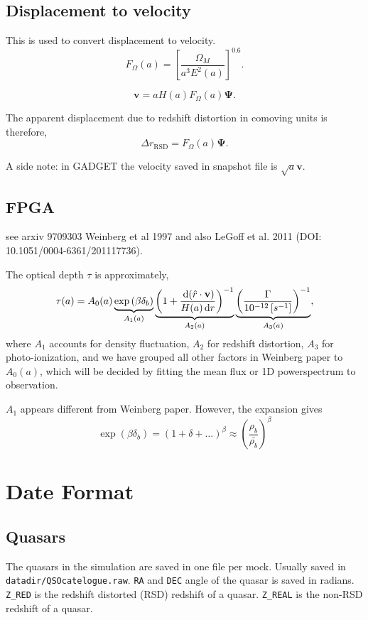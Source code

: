 \documentclass{paper}
\begin{document}
\subsection{Displacement to velocity}
This is used to convert displacement to velocity. 
\[
    F_\Omega(a) = \left[\frac{\Omega_M}{a^3 E^2(a)}\right]^{0.6} .
\]

\[
    \mathbf{v} = a H(a) F_\Omega(a) \mathbf{\Psi} .
\]

The apparent displacement due to redshift distortion in
comoving units is therefore,
\[
    \Delta r_\mathrm{RSD} = F_\Omega(a) \mathbf{\Psi} .
\]

A side note: in GADGET the velocity saved in snapshot file is 
$\sqrt{a}\mathbf{v}$.

\subsection{FPGA}
see arxiv 9709303 Weinberg et al 1997 and also  LeGoff et
al. 2011 (DOI: 10.1051/0004-6361/201117736).

The optical depth $\tau$ is approximately,
\[  \tau(a) = 
    A_0(a)
    \underbrace{
        \exp \left(\beta \delta_b \right)
    }_{A_1(a)}
    \underbrace{
        \left(1 + 
        \frac{\diff ( \hat{r} \cdot \mathbf{v})}
        {H(a) \diff r } \right)^{-1}
    }_{A_2(a)}
    \underbrace{
        \left(\frac{\Gamma}{\unit[10^{-12}][s^{-1}]}
        \right)^{-1}
    }_{A_3(a)}
    ,
\] where $A_1$ accounts for density fluctuation, 
         $A_2$ for redshift distortion, 
         $A_3$ for photo-ionization, 
   and we have grouped all other factors in Weinberg paper to $A_0(a)$, 
   which will be decided by fitting the mean flux or 1D
   powerspectrum to observation.

   $A_1$ appears different from Weinberg paper. However, the
   expansion gives
   \[ 
     \exp \left( \beta \delta_b \right)
     = (1 + \delta + \dots)^\beta
     \approx \left(\frac{\rho_b}{\bar{\rho_b}}\right)^\beta
   \]


\section{Date Format}
\subsection{Quasars}
    The quasars in the simulation are saved in one file per
    mock. Usually saved in {\tt
    datadir/QSOcatelogue.raw}. {\tt RA} and {\tt DEC} angle of the quasar is
    saved in radians. {\tt Z\_RED} is the redshift
    distorted (RSD) 
    redshift of a quasar. {\tt Z\_REAL} is the non-RSD 
    redshift of a quasar.
\end{document}
